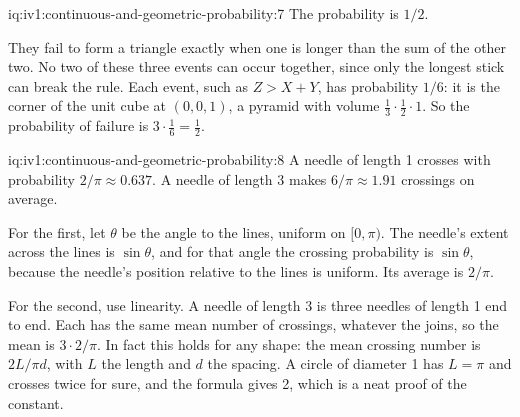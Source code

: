 \begin{solution}{iq:iv1:continuous-and-geometric-probability:7}
The probability is $1/2$.

They fail to form a triangle exactly when one is longer than the sum of the other two. No two of these three events can occur together, since only the longest stick can break the rule. Each event, such as $Z > X + Y$, has probability $1/6$: it is the corner of the unit cube at $(0, 0, 1)$, a pyramid with volume $\tfrac13 \cdot \tfrac12 \cdot 1$. So the probability of failure is $3 \cdot \tfrac16 = \tfrac12$.

\end{solution}

\begin{solution}{iq:iv1:continuous-and-geometric-probability:8}
A needle of length 1 crosses with probability $2/\pi \approx 0.637$. A needle of length 3 makes $6/\pi \approx 1.91$ crossings on average.

For the first, let $\theta$ be the angle to the lines, uniform on $[0, \pi)$. The needle's extent across the lines is $\sin\theta$, and for that angle the crossing probability is $\sin\theta$, because the needle's position relative to the lines is uniform. Its average is $2/\pi$.

For the second, use linearity. A needle of length 3 is three needles of length 1 end to end. Each has the same mean number of crossings, whatever the joins, so the mean is $3 \cdot 2/\pi$. In fact this holds for any shape: the mean crossing number is $2L/\pi d$, with $L$ the length and $d$ the spacing. A circle of diameter 1 has $L = \pi$ and crosses twice for sure, and the formula gives 2, which is a neat proof of the constant.

\end{solution}

